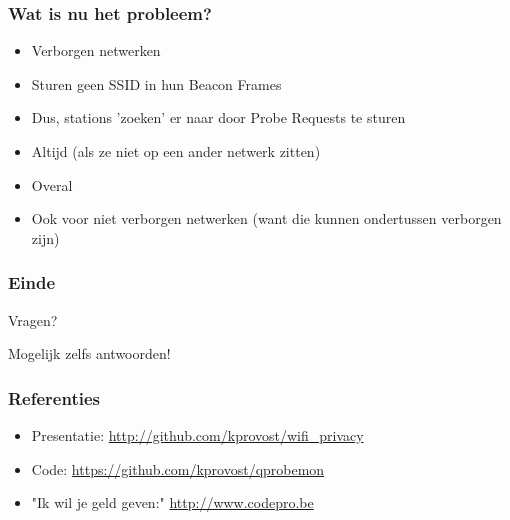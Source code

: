\documentclass{beamer}
\begin{document}

  \begin{frame}
    \frametitle{Wat is nu het probleem?}

    \begin{itemize}
      \item Verborgen netwerken
      \item Sturen geen SSID in hun Beacon Frames
      \item Dus, stations 'zoeken' er naar door Probe Requests te sturen
        \pause
      \item Altijd (als ze niet op een ander netwerk zitten)
      \item Overal
        \pause
      \item Ook voor niet verborgen netwerken (want die kunnen ondertussen verborgen zijn)
    \end{itemize}
  \end{frame}

  \begin{frame}
    \frametitle{Einde}
    \begin{center}
      \Huge Vragen?
    \end{center}
    \begin{center}
      \small Mogelijk zelfs antwoorden!
    \end{center}
  \end{frame}

  \begin{frame}
    \frametitle{Referenties}
    \begin{itemize}
        \item Presentatie: \url{http://github.com/kprovost/wifi_privacy}
        \item Code: \url{https://github.com/kprovost/qprobemon}
        \item "Ik wil je geld geven:" \url{http://www.codepro.be}
    \end{itemize}
  \end{frame}
\end{document}
